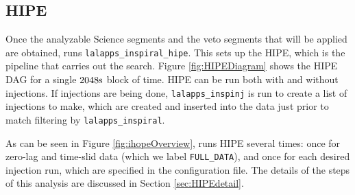 \subsection{HIPE}

Once the analyzable Science segments and the veto segments that will be applied
are obtained, \ihope runs \texttt{lalapps\_inspiral\_hipe}. This sets up the
\ac{HIPE}, which is the pipeline that carries out the search. Figure
\ref{fig:HIPEDiagram} shows the \ac{HIPE} \ac{DAG} for a single $2048\rm{s}$
block of time. \ac{HIPE} can be run both with and without injections. If
injections are being done, \texttt{lalapps\_inspinj} is run to create a list of
injections to make, which are created and inserted into the data just prior to
match filtering by \texttt{lalapps\_inspiral}.

As can be seen in Figure \ref{fig:ihopeOverview}, \ihope runs \ac{HIPE} several
times: once for zero-lag and time-slid data (which we label
\texttt{FULL\_DATA}), and once for each desired injection run, which are
specified in the configuration file. The details of the steps of this analysis
are discussed in Section \ref{sec:HIPEdetail}.

%
%

